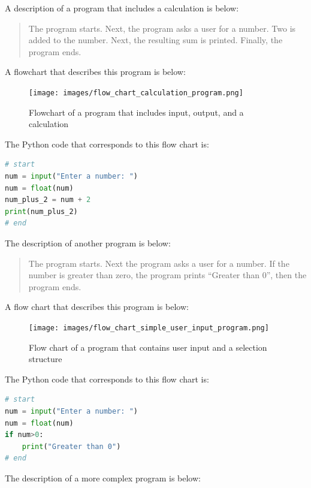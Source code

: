 \documentclass{book}
\begin{document}
    
        A description of a program that includes a calculation is below:

\begin{quote}
The program starts. Next, the program asks a user for a number. Two is
added to the number. Next, the resulting sum is printed. Finally, the
program ends.
\end{quote}

A flowchart that describes this program is below:

\begin{figure}
\centering
\texttt{[image: images/flow\_chart\_calculation\_program.png]}
\caption{Flowchart of a program that includes input, output, and a
calculation}
\end{figure}

The Python code that corresponds to this flow chart is:

\begin{lstlisting}[language=Python]
# start
num = input("Enter a number: ")
num = float(num)
num_plus_2 = num + 2
print(num_plus_2)
# end
\end{lstlisting}
    




    
        The description of another program is below:

\begin{quote}
The program starts. Next the program asks a user for a number. If the
number is greater than zero, the program prints ``Greater than 0'', then
the program ends.
\end{quote}

A flow chart that describes this program is below:

\begin{figure}
\centering
\texttt{[image: images/flow\_chart\_simple\_user\_input\_program.png]}
\caption{Flow chart of a program that contains user input and a
selection structure}
\end{figure}

The Python code that corresponds to this flow chart is:

\begin{lstlisting}[language=Python]
# start
num = input("Enter a number: ")
num = float(num)
if num>0:
    print("Greater than 0")
# end
\end{lstlisting}
    




    
        The description of a more complex program is below:
\end{document}

